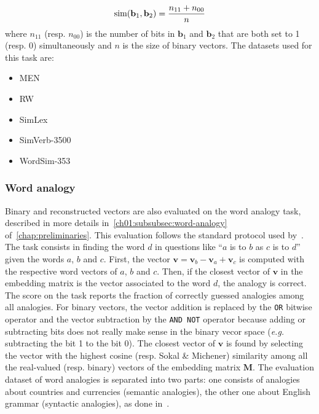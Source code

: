       \begin{equation}
        \text{sim}(\mathbf{b}_1, \mathbf{b}_2) = {n_{11} + n_{00} \over {n}}
      \end{equation}
      where $n_{11}$ (resp. $n_{00}$) is the number of bits in $\mathbf{b}_1$
      and $\mathbf{b}_2$ that are both set to 1 (resp. 0) simultaneously and $n$
      is the size of binary vectors. The datasets used for this task are:
      \begin{itemize}
        \item MEN~\citep{bruni2014multimodal}
        \item RW~\citep{luong2013better}
        \item SimLex~\citep{hill2015simlex}
        \item SimVerb-3500~\citep{gerz2016simverb}
        \item WordSim-353~\citep{finkelstein2001placing}
      \end{itemize}

    \subsubsection{Word analogy}
      Binary and reconstructed vectors are also evaluated on the word analogy
      task, described in more details in~\autoref{ch01:subsubsec:word-analogy}
      of~\autoref{chap:preliminaries}. This evaluation follows the standard
      protocol used by~\citet{mikolov2013distributed}. The task consists in
      finding the word $d$ in questions like ``$a$ is to $b$ as $c$ is to $d$''
      given the words $a$, $b$ and $c$. First, the vector $\mathbf{v} =
      \mathbf{v}_b - \mathbf{v}_a + \mathbf{v}_c$ is computed with the
      respective word vectors of $a$, $b$ and $c$. Then, if the closest vector
      of $\mathbf{v}$ in the embedding matrix is the vector associated to the
      word $d$, the analogy is correct. The score on the task reports the
      fraction of correctly guessed analogies among all analogies. For binary
      vectors, the vector addition is replaced by the \texttt{OR} bitwise
      operator and the vector subtraction by the \texttt{AND NOT} operator
      because adding or subtracting bits does not really make sense in the
      binary vecor space (\textit{e.g.} subtracting the bit 1 to the bit 0). The
      closest vector of $\mathbf{v}$ is found by selecting the vector with the
      highest cosine (resp. Sokal \& Michener) similarity among all the
      real-valued (resp. binary) vectors of the embedding matrix $\mathbf{M}$.
      The evaluation dataset of word analogies is separated into two parts: one
      consists of analogies about countries and currencies (semantic analogies),
      the other one about English grammar (syntactic analogies), as done
      in~\citep{mikolov2013distributed}.

